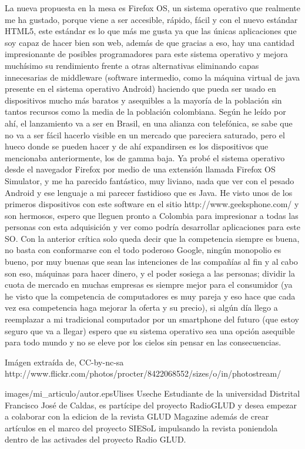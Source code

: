 \begin{multicols}{2}
La nueva propuesta en la mesa es Firefox OS, un sistema operativo que realmente me ha gustado, porque viene a ser accesible, rápido, fácil y con el nuevo estándar HTML5, este estándar es lo que más me gusta ya que las únicas aplicaciones que soy capaz de hacer bien son web, además de que gracias a eso, hay una cantidad impresionante de posibles programadores para este sistema operativo y mejora muchísimo su rendimiento frente a otras alternativas eliminando capas innecesarias de middleware (software intermedio, como la máquina virtual de java presente en el sistema operativo Android) haciendo que pueda ser usado en dispositivos mucho más baratos y asequibles a la mayoría de la población sin tantos recursos como la media de la población colombiana. Según he leído por ahí, el lanzamiento va a ser en Brasil, en una alianza con telefónica, se sabe que no va a ser fácil hacerlo visible en un mercado que pareciera saturado, pero el hueco donde se pueden hacer y de ahí expandirsen es los dispositivos que mencionaba anteriormente, los de gamma baja. Ya probé el sistema operativo desde el navegador Firefox por medio de una extensión llamada Firefox OS Simulator, y me ha parecido fantástico, muy liviano, nada que ver con el pesado Android y ese lenguaje a mi parecer fastidioso que es Java. He visto unos de los primeros dispositivos con este software en el sitio http://www.geeksphone.com/ y son hermosos, espero que lleguen pronto a Colombia para impresionar a todas las personas con esta adquisición y ver como podría desarrollar aplicaciones para este SO.
Con la anterior crítica solo queda decir que la competencia siempre es buena, no basta con conformarse con el todo poderoso Google, ningún monopolio es bueno, por muy buenas que sean las intenciones de las compañías al fin y al cabo son eso, máquinas para hacer dinero, y el poder sosiega a las personas; dividir la cuota de mercado en muchas empresas es siempre mejor para el consumidor (ya he visto que la competencia de computadores es muy pareja y eso hace que cada vez esa competencia haga mejorar la oferta y su precio), si algún día llego a reemplazar a mi tradicional computador por un smartphone del futuro (que estoy seguro que va a llegar) espero que su sistema operativo sea una opción asequible para todo mundo y no se eleve por los cielos sin pensar en las consecuencias.


\begin{bibliografia}
Imágen extraída de, CC-by-nc-sa
http://www.flickr.com/photos/procter/8422068552/sizes/o/in/photostream/
\end{bibliografia}


\begin{biografia}{images/mi_articulo/autor.eps}{Ulises Useche} %
Estudiante de  la universidad Distrital Francisco José de Caldas, es partícipe del proyecto RadioGLUD y desea empezar a colaborar con la edicion de la revista GLUD Magazine además de crear artículos en el marco del proyecto SIESoL impulsando la revista poniendola dentro de las activades del proyecto Radio GLUD.
\end{biografia}

\end{multicols} %


\clearpage
\pagebreak
